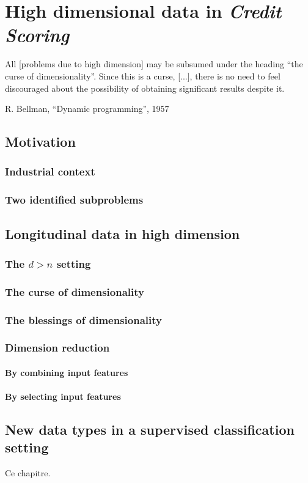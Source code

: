 \chapter{High dimensional data in \textit{Credit Scoring}} \label{chap7}

\epigraph{All [problems due to high dimension] may be subsumed under the heading “the curse of dimensionality”. Since this is a curse, [...], there is no need to feel discouraged about the possibility of obtaining significant results despite it.}{R. Bellman, ``Dynamic programming'', 1957}

\minitoc



\section{Motivation}

\subsection{Industrial context}


\subsection{Two identified subproblems}


\section{Longitudinal data in high dimension}

\subsection{The $d > n$ setting}


\subsection{The curse of dimensionality}


\subsection{The blessings of dimensionality}


\subsection{Dimension reduction}


\subsubsection{By combining input features}



\subsubsection{By selecting input features}


\section{New data types in a supervised classification setting}


\bigskip

Ce chapitre.


\printbibliography[heading=subbibliography, title=Références du chapitre 6]